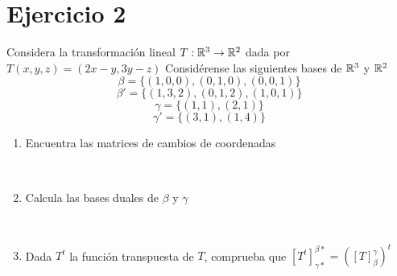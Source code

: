\section*{Ejercicio 2}

\noindent Considera la transformación lineal $T: \mathbb{R}^{3} \rightarrow \mathbb{R}^{2}$ dada por $T(x,y,z) = (2x-y,3y-z)$ Considérense
las siguientes bases de $\mathbb{R}^{3}$ y $\mathbb{R}^{2}$
\begin{equation*}
    \beta =  \{ (1,0,0), (0,1,0), (0,0,1) \}
\end{equation*}
\begin{equation*}
    \beta' =  \{ (1,3,2), (0,1,2), (1,0,1) \}
\end{equation*}
\begin{equation*}
    \gamma =  \{ (1,1), (2,1) \}
\end{equation*}
\begin{equation*}
    \gamma' =  \{ (3,1), (1,4) \}
\end{equation*}

\begin{enumerate}
    \item Encuentra las matrices de cambios de coordenadas 
    
    \noindent \solucion \\

    \item Calcula las bases duales de $\beta$ y $\gamma$
    
    \noindent \solucion \\
    \item Dada $T^{t}$ la función transpuesta de $T$, comprueba que $\left[ T^{t} \right]_{\gamma *}^{\beta *} = \left( \left[ T \right]_{\beta}^{\gamma} \right)^{t}$
    
    \noindent \solucion \\
\end{enumerate}

